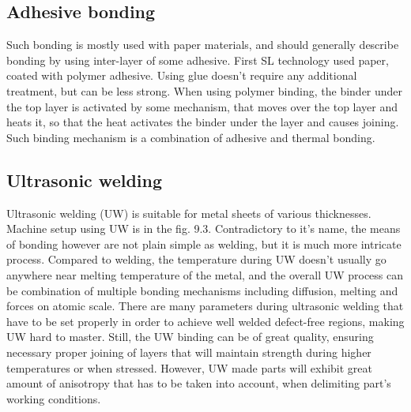 \documentclass[a4paper, 11pt, reqno]{report}
\begin{document}
\subsection{Adhesive bonding}
Such bonding is mostly used with paper materials, and should generally describe bonding by using inter-layer of some adhesive. First SL technology used paper, coated with polymer adhesive. Using glue doesn't require any additional treatment, but can be less strong. When using polymer binding, the binder under the top layer is activated by some mechanism, that moves over the top layer and heats it, so that the heat  activates the binder under the layer and causes joining. Such binding mechanism is a combination of adhesive and thermal bonding.

\subsection{Ultrasonic welding}
Ultrasonic welding (UW) is suitable for metal sheets of various thicknesses. Machine setup using UW is in the fig. 9.3. Contradictory to it's name, the means of bonding however are not plain simple as welding, but it is much more intricate process. Compared to welding, the temperature during UW doesn't usually go anywhere near melting temperature of the metal, and the overall UW process can be combination of multiple bonding mechanisms including diffusion, melting and forces on atomic scale. There are many parameters during ultrasonic welding that have to be set properly in order to achieve well welded defect-free regions, making UW hard to master. Still, the UW binding can be of great quality, ensuring necessary proper joining of layers that will maintain strength during higher temperatures or when stressed. However, UW made parts will exhibit great amount of anisotropy that has to be taken into account, when delimiting part's working conditions.
\end{document}
